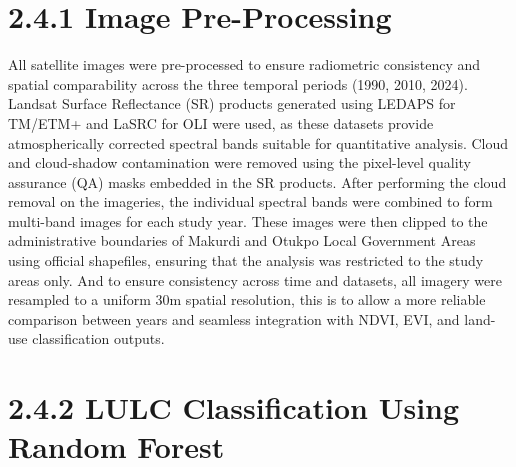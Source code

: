 \hypertarget{image-pre-processing}{%
\section{\texorpdfstring{\textbf{2.4.1 Image Pre-Processing}}{2.4.1 Image Pre-Processing}}\label{image-pre-processing}}

All satellite images were pre-processed to ensure radiometric consistency and spatial comparability across the three temporal periods (1990, 2010, 2024). Landsat Surface Reflectance (SR) products generated using LEDAPS for TM/ETM+ and LaSRC for OLI were used, as these datasets provide atmospherically corrected spectral bands suitable for quantitative analysis. Cloud and cloud-shadow contamination were removed using the pixel-level quality assurance (QA) masks embedded in the SR products. After performing the cloud removal on the imageries, the individual spectral bands were combined to form multi-band images for each study year. These images were then clipped to the administrative boundaries of Makurdi and Otukpo Local Government Areas using official shapefiles, ensuring that the analysis was restricted to the study areas only. And to ensure consistency across time and datasets, all imagery were resampled to a uniform 30m spatial resolution, this is to allow a more reliable comparison between years and seamless integration with NDVI, EVI, and land-use classification outputs.
\hypertarget{lulc-classification-using-random-forest}{%
\section{\texorpdfstring{\textbf{2.4.2 LULC Classification Using Random Forest}}{2.4.2 LULC Classification Using Random Forest}}\label{lulc-classification-using-random-forest}}

